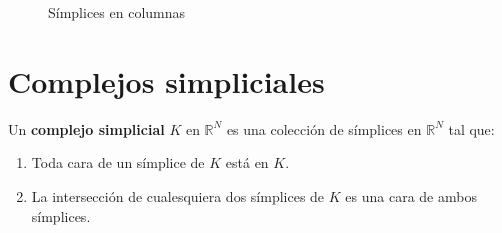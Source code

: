 \begin{ejemplo}
\begin{figure}[h]
	\begin{minipage}{.24\textwidth}
		\centering
		{
		}
	\end{minipage}
	\begin{minipage}{.24\textwidth}
		\centering
		{
		}
	\end{minipage}
	\begin{minipage}{.24\textwidth}
		\centering
		{
		}
	\end{minipage}
	\begin{minipage}{.24\textwidth}
		\centering
		{
		}
	\end{minipage}
	\caption{Símplices en columnas}
\end{figure}
\end{ejemplo}

\section{Complejos simpliciales}

\begin{definicion}
	Un \textbf{complejo simplicial} $K$ en $\mathbb{R}^N$ es una colección de símplices en $\mathbb{R}^N$
	 tal que:
	\begin{enumerate}
		\item Toda cara de un símplice de $K$ está en $K$.
		\item La intersección de cualesquiera dos símplices de $K$ es una cara 
		de ambos símplices.
	\end{enumerate}
\end{definicion}

